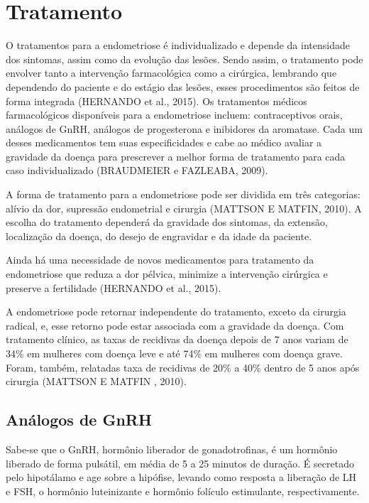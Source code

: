 \documentclass[12pt]{article} %
\begin{document}
\section{Tratamento} 

O tratamentos para a endometriose é individualizado e depende da
intensidade dos sintomas, assim como da evolução das lesões. Sendo
assim, o tratamento pode envolver tanto a intervenção farmacológica
como a cirúrgica, lembrando que dependendo do paciente e do estágio
das lesões, esses procedimentos são feitos de forma integrada (HERNANDO
et al., 2015). Os tratamentos médicos farmacológicos disponíveis para
a endometriose incluem: contraceptivos orais, análogos de GnRH,
análogos de progesterona e inibidores da aromatase. Cada um desses
medicamentos tem suas especificidades e cabe ao médico avaliar a
gravidade da doença para prescrever a melhor forma de tratamento para
cada caso individualizado (BRAUDMEIER e FAZLEABA, 2009).

A forma de tratamento para a endometriose pode ser dividida em três
categorias: alívio da dor, supressão endometrial e cirurgia (MATTSON E MATFIN, 2010). A escolha do tratamento dependerá da gravidade dos
sintomas, da extensão, localização da doença, do desejo de engravidar
e da idade da paciente.

Ainda há uma necessidade de novos medicamentos para tratamento da
endometriose que reduza a dor pélvica, minimize a intervenção
cirúrgica e preserve a fertilidade (HERNANDO et al., 2015).

A endometriose pode retornar independente do tratamento, exceto da
cirurgia radical, e, esse retorno pode estar associada com a gravidade
da doença. Com tratamento clínico, as taxas de recidivas da doença
depois de 7 anos variam de 34\% em mulheres com doença leve e até 74\%
em mulheres com doença grave. Foram, também, relatadas taxa de
recidivas de 20\% a 40\% dentro de 5 anos após cirurgia (MATTSON E MATFIN , 2010).

\subsection{Análogos de GnRH}

Sabe-se que o GnRH, hormônio liberador de gonadotrofinas, é um
hormônio liberado de forma pulsátil, em média de 5 a 25 minutos de
duração. É secretado pelo hipotálamo e age sobre a hipófise, levando
como resposta a liberação de LH e FSH, o hormônio luteinizante e
hormônio folículo estimulante, respectivamente.
\end{document}
